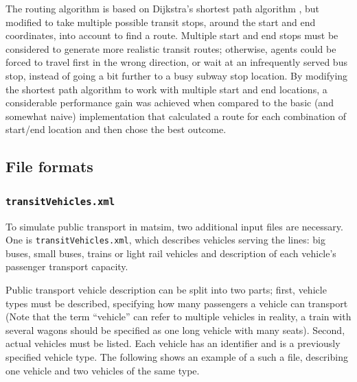 The routing algorithm is based on Dijkstra's shortest path algorithm
\citep{Dijkstra_NM_1959}, but modified to take
multiple possible transit stops, around the start and end coordinates,
into account to find a route. Multiple start and end stops must be considered
to generate more realistic transit routes; otherwise, agents could
be forced to travel first in the wrong direction, or wait at an infrequently
served bus stop, instead of going a bit further to a busy subway stop location.
By modifying the shortest path algorithm to work with multiple start and end
locations, a considerable performance gain was achieved when compared to the basic (and somewhat naive)
implementation that calculated a route for each combination of start/end location
and then chose the best outcome.
%

\subsection{File formats}

\subsubsection{\lstinline|transitVehicles.xml|}
\label{sec:inputdata:transitvehicles}



To simulate public transport in \gls{matsim}, two additional input files are necessary. One is \lstinline|transitVehicles.xml|, which describes vehicles serving the lines: big buses, small buses, trains or light rail vehicles and description of each vehicle's passenger transport capacity.

Public transport vehicle description can be split into two parts; first, vehicle types must be described, specifying how many passengers a vehicle can transport (Note that the term ``vehicle'' can refer to multiple vehicles in reality, \eg a train with several wagons should be specified as one long vehicle with many seats). Second, actual vehicles must be listed. Each vehicle has an identifier and is a previously specified vehicle type. The following shows an example of a such a file, describing one vehicle  and two vehicles of the same type. 

